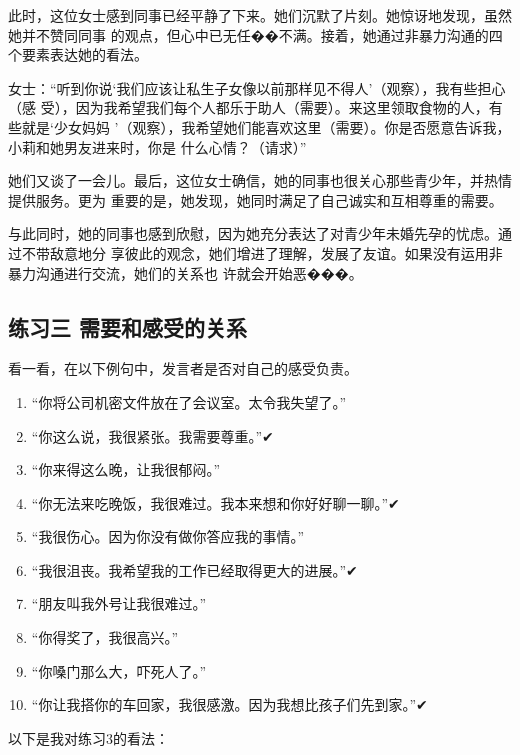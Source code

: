 \documentclass{ctexart}
\renewenvironment{quotation}{\setlength{\parskip}{0.5em}\setstretch{1.5}\kaishu\zihao{-5}\setlength{\parindent}{1em}}{\vspace{1em}}
\begin{document}
此时，这位女士感到同事已经平静了下来。她们沉默了片刻。她惊讶地发现，虽然她并不赞同同事
的观点，但心中已无任��不满。接着，她通过非暴力沟通的四个要素表达她的看法。

\begin{quotation}
	女士：``听到你说`我们应该让私生子女像以前那样见不得人'（观察），我有些担心（感
	受），因为我希望我们每个人都乐于助人（需要）。来这里领取食物的人，有些就是`少女妈妈
	'（观察），我希望她们能喜欢这里（需要）。你是否愿意告诉我，小莉和她男友进来时，你是
	什么心情？（请求）''
\end{quotation}

她们又谈了一会儿。最后，这位女士确信，她的同事也很关心那些青少年，并热情提供服务。更为
重要的是，她发现，她同时满足了自己诚实和互相尊重的需要。

与此同时，她的同事也感到欣慰，因为她充分表达了对青少年未婚先孕的忧虑。通过不带敌意地分
享彼此的观念，她们增进了理解，发展了友谊。如果没有运用非暴力沟通进行交流，她们的关系也
许就会开始恶���。


\subsection{练习三 需要和感受的关系}

看一看，在以下例句中，发言者是否对自己的感受负责。

\begin{enumerate}[label=\arabic*)]
	\item ``你将公司机密文件放在了会议室。太令我失望了。''
	\item ``你这么说，我很紧张。我需要尊重。''✔
	\item ``你来得这么晚，让我很郁闷。''
	\item ``你无法来吃晚饭，我很难过。我本来想和你好好聊一聊。''✔
	\item ``我很伤心。因为你没有做你答应我的事情。''
	\item ``我很沮丧。我希望我的工作已经取得更大的进展。''✔
	\item ``朋友叫我外号让我很难过。''
	\item ``你得奖了，我很高兴。''
	\item ``你嗓门那么大，吓死人了。''
	\item ``你让我搭你的车回家，我很感激。因为我想比孩子们先到家。''✔
\end{enumerate}

以下是我对练习3的看法：
\end{document}
